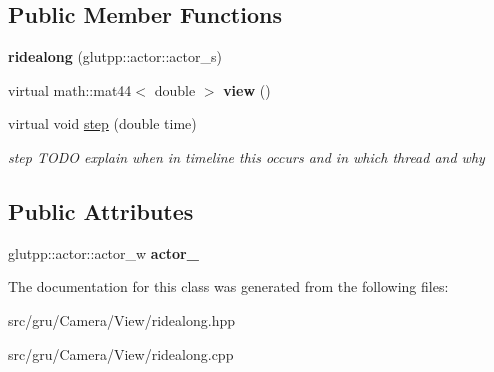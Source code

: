 \subsection*{\-Public \-Member \-Functions}
\begin{DoxyCompactItemize}
\item 
\hypertarget{classglutpp_1_1Camera_1_1View_1_1ridealong_ae6b8552cf2fc6ca0892276225f367483}{{\bfseries ridealong} (glutpp\-::actor\-::actor\-\_\-s)}\label{classglutpp_1_1Camera_1_1View_1_1ridealong_ae6b8552cf2fc6ca0892276225f367483}

\item 
\hypertarget{classglutpp_1_1Camera_1_1View_1_1ridealong_ad3fc1f7dd236304209258822a469adb1}{virtual math\-::mat44$<$ double $>$ {\bfseries view} ()}\label{classglutpp_1_1Camera_1_1View_1_1ridealong_ad3fc1f7dd236304209258822a469adb1}

\item 
\hypertarget{classglutpp_1_1Camera_1_1View_1_1ridealong_a4ab29cdafb2d4ba835485f47d41ae2b6}{virtual void \hyperlink{classglutpp_1_1Camera_1_1View_1_1ridealong_a4ab29cdafb2d4ba835485f47d41ae2b6}{step} (double time)}\label{classglutpp_1_1Camera_1_1View_1_1ridealong_a4ab29cdafb2d4ba835485f47d41ae2b6}

\begin{DoxyCompactList}\small\item\em step \-T\-O\-D\-O explain when in timeline this occurs and in which thread and why \end{DoxyCompactList}\end{DoxyCompactItemize}
\subsection*{\-Public \-Attributes}
\begin{DoxyCompactItemize}
\item 
\hypertarget{classglutpp_1_1Camera_1_1View_1_1ridealong_abf4b639b7731da7c44d2b4b6625c89b9}{glutpp\-::actor\-::actor\-\_\-w {\bfseries actor\-\_\-}}\label{classglutpp_1_1Camera_1_1View_1_1ridealong_abf4b639b7731da7c44d2b4b6625c89b9}

\end{DoxyCompactItemize}


\-The documentation for this class was generated from the following files\-:\begin{DoxyCompactItemize}
\item 
src/gru/\-Camera/\-View/ridealong.\-hpp\item 
src/gru/\-Camera/\-View/ridealong.\-cpp\end{DoxyCompactItemize}
